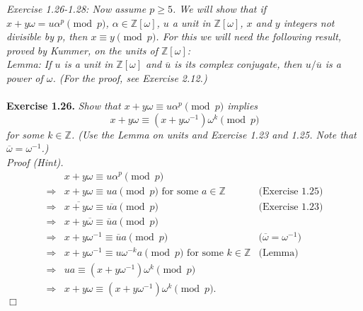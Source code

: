 \documentclass{article}
\begin{document}



\emph{Exercise 1.26-1.28: Now assume $p \geq 5$.
We will show that if $x+y\omega = u\alpha^p \pmod{p}$,
$\alpha \in \mathbb{Z}[\omega]$,
$u$ a unit in $\mathbb{Z}[\omega]$,
$x$ and $y$ integers not divisible by $p$,
then $x \equiv y \pmod{p}$.
For this we will need the following result, proved by Kummer,
on the units of $\mathbb{Z}[\omega]$:} \\

\emph{Lemma: If $u$ is a unit in $\mathbb{Z}[\omega]$ and
$\overline{u}$ is its complex conjugate, then $u/\overline{u}$
is a power of $\omega$.
(For the proof, see Exercise 2.12.)} \\\\






\textbf{Exercise 1.26.}
\emph{Show that $x + y\omega \equiv u \alpha^p \pmod{p}$ implies
$$x + y\omega \equiv (x + y\omega^{-1}) \omega^k \pmod{p}$$
for some $k \in \mathbb{Z}$.
(Use the Lemma on units and Exercise 1.23 and 1.25.
Note that $\overline{\omega} = \omega^{-1}$.) } \\

\emph{Proof (Hint).}
\begin{align*}
&x + y\omega \equiv u \alpha^p \pmod{p} \\
\Longrightarrow&
x + y\omega \equiv ua \pmod{p} \text{ for some } a \in \mathbb{Z}
  &\text{(Exercise 1.25)} \\
\Longrightarrow&
\overline{x + y\omega} \equiv \overline{u a} \pmod{p}
  &\text{(Exercise 1.23)} \\
\Longrightarrow&
x + y\overline{\omega} \equiv \overline{u} a \pmod{p} \\
\Longrightarrow&
x + y \omega^{-1} \equiv \overline{u} a \pmod{p}
  &\text{($\overline{\omega} = \omega^{-1}$)} \\
\Longrightarrow&
x + y \omega^{-1} \equiv u \omega^{-k} a \pmod{p} \text{ for some } k \in \mathbb{Z}
  &\text{(Lemma)} \\
\Longrightarrow&
ua \equiv (x + y \omega^{-1})\omega^{k} \pmod{p} \\
\Longrightarrow&
x + y\omega \equiv (x + y \omega^{-1})\omega^{k} \pmod{p}.
\end{align*}
$\Box$ \\\\
\end{document}
